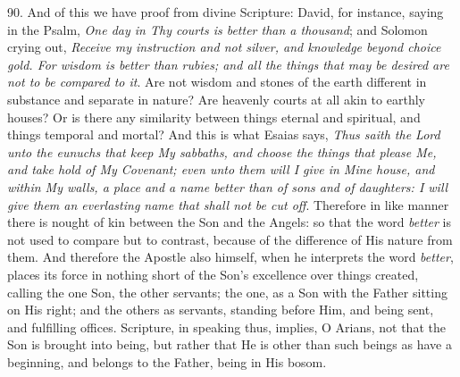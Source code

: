90. And of this we have proof
from divine Scripture: David, for instance, saying in the Psalm, \emph{One
day in Thy courts is better than a thousand}; and Solomon crying
out, \emph{Receive my instruction and not silver, and knowledge beyond
choice gold. For wisdom is better than rubies; and all the things that
may be desired are not to be compared to it}. Are not wisdom and
stones of the earth different in substance and separate in nature? Are
heavenly courts at all akin to earthly houses? Or is there any
similarity between things eternal and spiritual, and things temporal
and mortal? And this is what Esaias says, \emph{Thus saith the Lord unto
the eunuchs that keep My sabbaths, and choose the things that please
Me, and take hold of My Covenant; even unto them will I give in Mine
house, and within My walls, a place and a name better than of sons and
of daughters: I will give them an everlasting name that shall not be
cut off}. Therefore in like manner there is nought of kin between
the Son and the Angels: so that the word \emph{better} is not used to
compare but to contrast, because of the difference of His nature from
them. And therefore the Apostle also himself, when he interprets the
word \emph{better}, places its force in nothing short of the Son's
excellence over things created, calling the one Son, the other
servants; the one, as a Son with the Father sitting on His right; and
the others as servants, standing before Him, and being sent, and
fulfilling offices. Scripture, in speaking thus, implies, O
Arians, not that the Son is brought into being, but rather that He is
other than such beings as have a beginning, and belongs to the Father,
being in His bosom.

